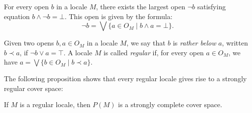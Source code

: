 \documentclass[pdflatex,sn-mathphys-num]{sn-jnl}
\theoremstyle{definition}
\theoremstyle{remark}
\numberwithin{figure}{section}
\newcommand{\rb}{\prec}
\begin{document}
For every open $b$ in a locale $M$, there exists the largest open $\neg b$ satisfying equation $b \wedge \neg b = \bot$.
This open is given by the formula:
\[ \neg b = \bigvee \{ a \in O_M \mid b \wedge a = \bot \}. \]

\begin{defn}
Given two opens $b,a \in O_M$ in a locale $M$, we say that $b$ is \emph{rather below} $a$, written $b \rb a$, if $\neg b \vee a = \top$.
A locale $M$ is called \emph{regular} if, for every open $a \in O_M$, we have $a = \bigvee \{ b \in O_M \mid b \rb a \}$.
\end{defn}

The following proposition shows that every regular locale gives rise to a strongly regular cover space:

\begin{prop}
If $M$ is a regular locale, then $P(M)$ is a strongly complete cover space.
\end{prop}
\end{document}
